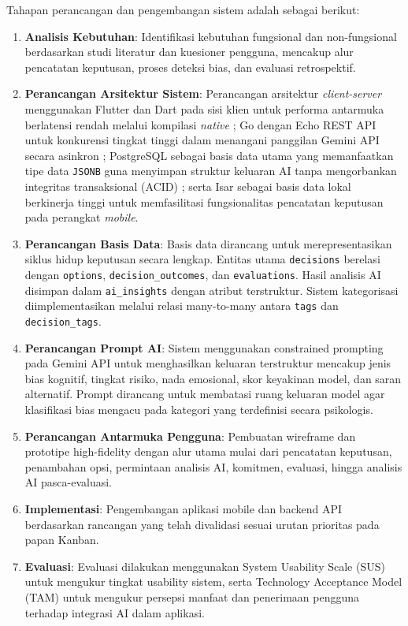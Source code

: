 \documentclass[11pt]{article}
\begin{document}
Tahapan perancangan dan pengembangan sistem adalah sebagai berikut:
\begin{enumerate}
  \item \textbf{Analisis Kebutuhan}: Identifikasi kebutuhan fungsional dan non-fungsional berdasarkan studi literatur dan kuesioner pengguna, mencakup alur pencatatan keputusan, proses deteksi bias, dan evaluasi retrospektif.
\item \textbf{Perancangan Arsitektur Sistem}: Perancangan arsitektur \textit{client-server} menggunakan Flutter dan Dart pada sisi klien untuk performa antarmuka berlatensi rendah melalui kompilasi \textit{native} \cite{ieee2025flutter}; Go dengan Echo REST API untuk konkurensi tingkat tinggi dalam menangani panggilan Gemini API secara asinkron \cite{jutif2025golang}; PostgreSQL sebagai basis data utama yang memanfaatkan tipe data \texttt{JSONB} guna menyimpan struktur keluaran AI tanpa mengorbankan integritas transaksional (ACID) \cite{ijres2025postgres}; serta Isar sebagai basis data lokal berkinerja tinggi untuk memfasilitasi fungsionalitas pencatatan keputusan pada perangkat \textit{mobile}.  \item \textbf{Perancangan Basis Data}: Basis data dirancang untuk merepresentasikan siklus hidup keputusan secara lengkap. Entitas utama \texttt{decisions} berelasi dengan \texttt{options}, \texttt{decision\_outcomes}, dan \texttt{evaluations}. Hasil analisis AI disimpan dalam \texttt{ai\_insights} dengan atribut terstruktur. Sistem kategorisasi diimplementasikan melalui relasi many-to-many antara \texttt{tags} dan \texttt{decision\_tags}.
  \item \textbf{Perancangan Prompt AI}: Sistem menggunakan constrained prompting pada Gemini API untuk menghasilkan keluaran terstruktur mencakup jenis bias kognitif, tingkat risiko, nada emosional, skor keyakinan model, dan saran alternatif. Prompt dirancang untuk membatasi ruang keluaran model agar klasifikasi bias mengacu pada kategori yang terdefinisi secara psikologis.
  \item \textbf{Perancangan Antarmuka Pengguna}: Pembuatan wireframe dan prototipe high-fidelity dengan alur utama mulai dari pencatatan keputusan, penambahan opsi, permintaan analisis AI, komitmen, evaluasi, hingga analisis AI pasca-evaluasi.
  \item \textbf{Implementasi}: Pengembangan aplikasi mobile dan backend API berdasarkan rancangan yang telah divalidasi sesuai urutan prioritas pada papan Kanban.
  \item \textbf{Evaluasi}: Evaluasi dilakukan menggunakan System Usability Scale (SUS) untuk mengukur tingkat usability sistem, serta Technology Acceptance Model (TAM) untuk mengukur persepsi manfaat dan penerimaan pengguna terhadap integrasi AI dalam aplikasi.\end{enumerate}
 
\end{document}

